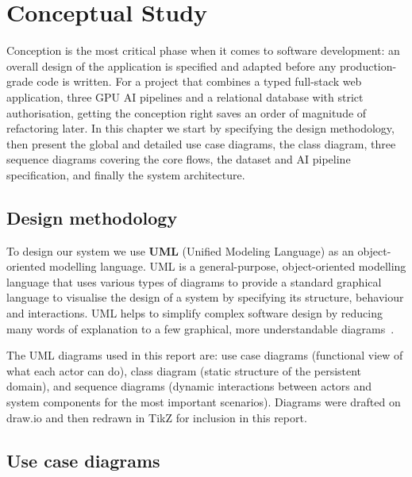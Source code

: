 \chapter{Conceptual Study}

\chapintro
Conception is the most critical phase when it comes to software development: an overall
design of the application is specified and adapted before any production-grade code is
written. For a project that combines a typed full-stack web application, three GPU AI
pipelines and a relational database with strict authorisation, getting the conception right
saves an order of magnitude of refactoring later. In this chapter we start by specifying the
design methodology, then present the global and detailed use case diagrams, the class diagram,
three sequence diagrams covering the core flows, the dataset and AI pipeline specification,
and finally the system architecture.

\section{Design methodology}
\label{sec:design_methodology}

To design our system we use \textbf{UML} (Unified Modeling Language) as an object-oriented
modelling language. UML is a general-purpose, object-oriented modelling language that uses
various types of diagrams to provide a standard graphical language to visualise the design of
a system by specifying its structure, behaviour and interactions. UML helps to simplify
complex software design by reducing many words of explanation to a few graphical, more
understandable diagrams~\cite{uml_classdiag,uml_seqdiag}.

The UML diagrams used in this report are: use case diagrams (functional view of what each
actor can do), class diagram (static structure of the persistent domain), and sequence
diagrams (dynamic interactions between actors and system components for the most important
scenarios). Diagrams were drafted on draw.io and then redrawn in TikZ for inclusion in this
report.

\section{Use case diagrams}
\label{sec:usecases}

